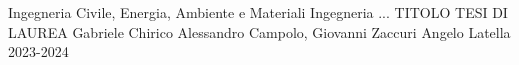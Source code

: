 \frontespizio
    {Ingegneria Civile, Energia, Ambiente e Materiali} %
    {Ingegneria ...}                                   %
    {TITOLO TESI DI LAUREA}                            %
    {Gabriele Chirico}                                 %
    {Alessandro Campolo, Giovanni Zaccuri}             %
    {Angelo Latella}                                   %
    {2023-2024}                                        %
